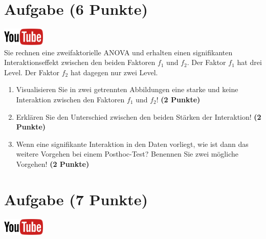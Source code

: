 \documentclass[a4paper, 10pt]{scrartcl}\usepackage[]{graphicx}\usepackage[]{xcolor}
\begin{document}
 
\clearpage

\section{Aufgabe \hfill (6 Punkte)}

\hfill\href{https://youtu.be/2qG1Dws0MJo}{\includegraphics[width =
  2cm]{img/youtube}}\\[1Ex]


Sie rechnen eine zweifaktorielle ANOVA und erhalten einen signifikanten
Interaktionseffekt zwischen den beiden Faktoren $f_1$ und $f_2$. Der Faktor
$f_1$ hat drei Level. Der Faktor $f_2$ hat dagegen nur zwei Level.




\begin{enumerate}
\item Visualisieren Sie in zwei getrennten Abbildungen 
  eine starke und keine Interaktion zwischen
  den Faktoren $f_1$ und $f_2$! \textbf{(2 Punkte)}
\item Erkl{\"a}ren Sie den Unterschied zwischen den beiden St{\"a}rken der Interaktion!
  \textbf{(2 Punkte)}
\item Wenn eine signifikante Interaktion in den Daten vorliegt, wie ist
  dann das weitere Vorgehen bei einem Posthoc-Test? Benennen Sie zwei
  m{\"o}gliche Vorgehen!
  \textbf{(2 Punkte)}
\end{enumerate}

 
\clearpage

\section{Aufgabe \hfill (7 Punkte)}

\hfill\href{https://youtu.be/M9Uhm67ndxM}{\includegraphics[width =
  2cm]{img/youtube}}\\[1Ex]
\end{document}
